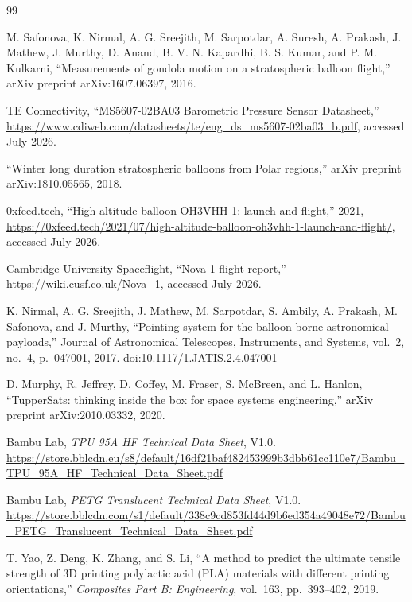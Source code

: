 \begin{thebibliography}{99}

 M. Safonova, K. Nirmal, A. G. Sreejith, M. Sarpotdar,
A. Suresh, A. Prakash, J. Mathew, J. Murthy, D. Anand, B. V. N. Kapardhi,
B. S. Kumar, and P. M. Kulkarni, ``Measurements of gondola motion on a
stratospheric balloon flight,'' arXiv preprint arXiv:1607.06397, 2016.

 TE Connectivity, ``MS5607-02BA03 Barometric Pressure
Sensor Datasheet,''
\url{https://www.cdiweb.com/datasheets/te/eng_ds_ms5607-02ba03_b.pdf},
accessed July 2026.

 ``Winter long duration stratospheric balloons
from Polar regions,'' arXiv preprint arXiv:1810.05565, 2018.

 0xfeed.tech, ``High altitude balloon OH3VHH-1: launch
and flight,'' 2021,
\url{https://0xfeed.tech/2021/07/high-altitude-balloon-oh3vhh-1-launch-and-flight/},
accessed July 2026.

 Cambridge University Spaceflight, ``Nova 1 flight
report,'' \url{https://wiki.cusf.co.uk/Nova_1}, accessed July 2026.

 K. Nirmal, A. G. Sreejith, J. Mathew, M. Sarpotdar,
S. Ambily, A. Prakash, M. Safonova, and J. Murthy, ``Pointing system for
the balloon-borne astronomical payloads,'' Journal of Astronomical
Telescopes, Instruments, and Systems, vol.~2, no.~4, p.~047001, 2017.
doi:10.1117/1.JATIS.2.4.047001

 D. Murphy, R. Jeffrey, D. Coffey, M. Fraser,
S. McBreen, and L. Hanlon, ``TupperSats: thinking inside the box for
space systems engineering,'' arXiv preprint arXiv:2010.03332, 2020.

 Bambu Lab, \emph{TPU 95A HF Technical Data Sheet}, V1.0.
\url{https://store.bblcdn.eu/s8/default/16df21baf482453999b3dbb61cc110e7/Bambu_TPU_95A_HF_Technical_Data_Sheet.pdf}

 Bambu Lab, \emph{PETG Translucent Technical Data Sheet}, V1.0.
\url{https://store.bblcdn.com/s1/default/338c9cd853fd44d9b6ed354a49048e72/Bambu_PETG_Translucent_Technical_Data_Sheet.pdf}

 T. Yao, Z. Deng, K. Zhang, and S. Li, ``A method to predict the
ultimate tensile strength of 3D printing polylactic acid (PLA) materials
with different printing orientations,'' \emph{Composites Part B:
Engineering}, vol.~163, pp.~393--402, 2019.


\end{thebibliography}
